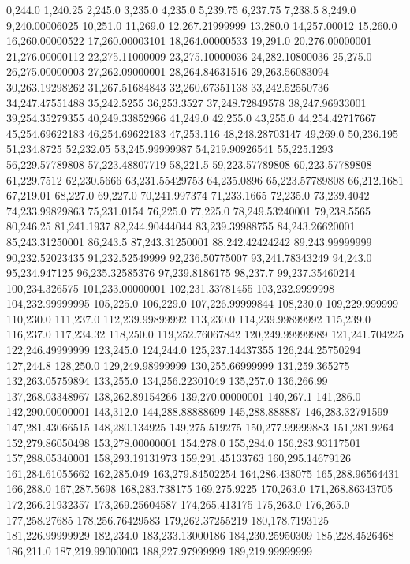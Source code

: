 0,244.0
1,240.25
2,245.0
3,235.0
4,235.0
5,239.75
6,237.75
7,238.5
8,249.0
9,240.00006025
10,251.0
11,269.0
12,267.21999999
13,280.0
14,257.00012
15,260.0
16,260.00000522
17,260.00003101
18,264.00000533
19,291.0
20,276.00000001
21,276.00000112
22,275.11000009
23,275.10000036
24,282.10800036
25,275.0
26,275.00000003
27,262.09000001
28,264.84631516
29,263.56083094
30,263.19298262
31,267.51684843
32,260.67351138
33,242.52550736
34,247.47551488
35,242.5255
36,253.3527
37,248.72849578
38,247.96933001
39,254.35279355
40,249.33852966
41,249.0
42,255.0
43,255.0
44,254.42717667
45,254.69622183
46,254.69622183
47,253.116
48,248.28703147
49,269.0
50,236.195
51,234.8725
52,232.05
53,245.99999987
54,219.90926541
55,225.1293
56,229.57789808
57,223.48807719
58,221.5
59,223.57789808
60,223.57789808
61,229.7512
62,230.5666
63,231.55429753
64,235.0896
65,223.57789808
66,212.1681
67,219.01
68,227.0
69,227.0
70,241.997374
71,233.1665
72,235.0
73,239.4042
74,233.99829863
75,231.0154
76,225.0
77,225.0
78,249.53240001
79,238.5565
80,246.25
81,241.1937
82,244.90444044
83,239.39988755
84,243.26620001
85,243.31250001
86,243.5
87,243.31250001
88,242.42424242
89,243.99999999
90,232.52023435
91,232.52549999
92,236.50775007
93,241.78343249
94,243.0
95,234.947125
96,235.32585376
97,239.8186175
98,237.7
99,237.35460214
100,234.326575
101,233.00000001
102,231.33781455
103,232.9999998
104,232.99999995
105,225.0
106,229.0
107,226.99999844
108,230.0
109,229.999999
110,230.0
111,237.0
112,239.99899992
113,230.0
114,239.99899992
115,239.0
116,237.0
117,234.32
118,250.0
119,252.76067842
120,249.99999989
121,241.704225
122,246.49999999
123,245.0
124,244.0
125,237.14437355
126,244.25750294
127,244.8
128,250.0
129,249.98999999
130,255.66999999
131,259.365275
132,263.05759894
133,255.0
134,256.22301049
135,257.0
136,266.99
137,268.03348967
138,262.89154266
139,270.00000001
140,267.1
141,286.0
142,290.00000001
143,312.0
144,288.88888699
145,288.888887
146,283.32791599
147,281.43066515
148,280.134925
149,275.519275
150,277.99999883
151,281.9264
152,279.86050498
153,278.00000001
154,278.0
155,284.0
156,283.93117501
157,288.05340001
158,293.19131973
159,291.45133763
160,295.14679126
161,284.61055662
162,285.049
163,279.84502254
164,286.438075
165,288.96564431
166,288.0
167,287.5698
168,283.738175
169,275.9225
170,263.0
171,268.86343705
172,266.21932357
173,269.25604587
174,265.413175
175,263.0
176,265.0
177,258.27685
178,256.76429583
179,262.37255219
180,178.7193125
181,226.99999929
182,234.0
183,233.13000186
184,230.25950309
185,228.4526468
186,211.0
187,219.99000003
188,227.97999999
189,219.99999999

